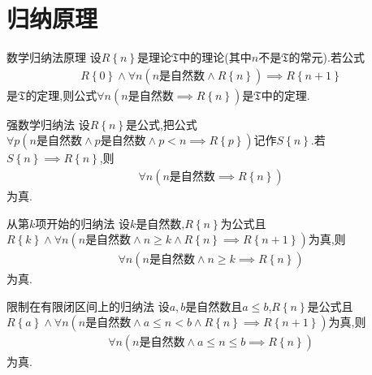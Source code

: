 \section{归纳原理}

\begin{metatheorem}{数学归纳法原理}{}
	设$R\left\{n\right\}$是理论$\mathfrak{T}$中的理论(其中$n$不是$\mathfrak{T}$的常元).若公式
	\begin{align*}
		R\left\{0\right\}\wedge\forall n\left(n\text{是自然数}\wedge R\left\{n\right\}\right)\implies R\left\{n+1\right\}
	\end{align*}
	是$\mathfrak{T}$的定理,则公式$\forall n\left(n\text{是自然数}\implies R\left\{n\right\}\right)$是$\mathfrak{T}$中的定理.
\end{metatheorem}

\begin{corollary}{强数学归纳法}{}
	设$R\left\{n\right\}$是公式,把公式$\forall p\left(n\text{是自然数}\wedge p\text{是自然数}\wedge p<n\implies R\left\{p\right\}\right)$记作$S\left\{n\right\}$.若$S\left\{n\right\}\implies R\left\{n\right\}$,则
	\begin{align*}
		\forall n\left(n\text{是自然数}\implies R\left\{n\right\}\right)
	\end{align*}
	为真.
\end{corollary}

\begin{corollary}{从第$k$项开始的归纳法}{}
	设$k$是自然数,$R\left\{n\right\}$为公式且$R\left\{k\right\}\wedge\forall n\left(n\text{是自然数}\wedge n\geq k\wedge R\left\{n\right\}\implies R\left\{n+1\right\}\right)$为真,则
	\begin{align*}
		\forall n\left(n\text{是自然数}\wedge n\geq k\implies R\left\{n\right\}\right)
	\end{align*}
	为真.
\end{corollary}

\begin{corollary}{限制在有限闭区间上的归纳法}{}
	设$a,b$是自然数且$a\leq b$,$R\left\{n\right\}$是公式且$R\left\{a\right\}\wedge\forall n\left(n\text{是自然数}\wedge a\leq n<b\wedge R\left\{n\right\}\implies R\left\{n+1\right\}\right)$为真,则
	\begin{align*}
		\forall n\left(n\text{是自然数}\wedge a\leq n\leq b\implies R\left\{n\right\}\right)
	\end{align*}
	为真.
\end{corollary}

